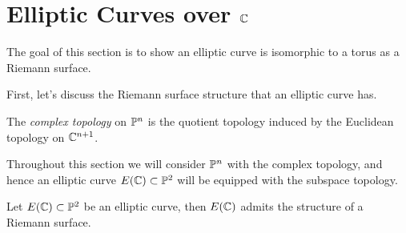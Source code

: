 \section{Elliptic Curves over \texorpdfstring{$\mathbb{C}$}{C}}
\label{sec:over-C}

The goal of this section is to show an elliptic curve is
isomorphic to a torus as a Riemann surface.

First, let's discuss the Riemann surface structure that an elliptic curve has.

\begin{definition}
	The \emph{complex topology} on $\mathbb{P}^n$ is the quotient topology induced
	by the Euclidean topology on $\mathbb{C}^{n+1}$.
\end{definition}

Throughout this section we will consider $\mathbb{P}^n$ with the complex topology,
and hence an elliptic curve $E(\mathbb{C}) \subset \mathbb{P}^2$ will be equipped with
the subspace topology.

\begin{proposition}
	\label{prop:riemann-surf-struct}
	Let $E(\mathbb{C}) \subset \mathbb{P}^2$ be an elliptic curve, then $E(\mathbb{C})$ admits
	the structure of a Riemann surface.
\end{proposition}

